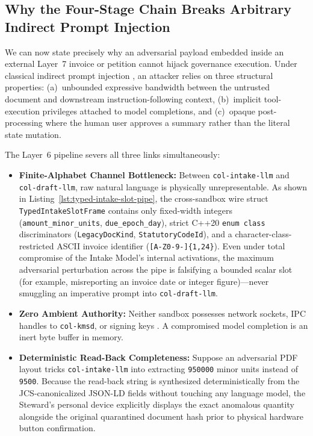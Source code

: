 \subsection{Why the Four-Stage Chain Breaks Arbitrary Indirect Prompt Injection}
\label{subsec:injection-proof}

We can now state precisely why an adversarial payload embedded inside an external Layer~7 invoice or petition cannot hijack governance execution. Under classical indirect prompt injection \parencite{greshake2023injection}, an attacker relies on three structural properties: (a)~unbounded expressive bandwidth between the untrusted document and downstream instruction-following context, (b)~implicit tool-execution privileges attached to model completions, and (c)~opaque post-processing where the human user approves a summary rather than the literal state mutation.

The Layer~6 pipeline severs all three links simultaneously:
\begin{itemize}
  \item \textbf{Finite-Alphabet Channel Bottleneck:} Between \texttt{col-intake-llm} and \texttt{col-draft-llm}, raw natural language is physically unrepresentable. As shown in Listing~\ref{lst:typed-intake-slot-pipe}, the cross-sandbox wire struct \texttt{TypedIntakeSlotFrame} contains only fixed-width integers (\texttt{amount\_minor\_units}, \texttt{due\_epoch\_day}), strict C++20 \texttt{enum class} discriminators (\texttt{LegacyDocKind}, \texttt{StatutoryCodeId}), and a character-class-restricted ASCII invoice identifier (\texttt{[A-Z0-9-]\{1,24\}}). Even under total compromise of the Intake Model's internal activations, the maximum adversarial perturbation across the pipe is falsifying a bounded scalar slot (for example, misreporting an invoice date or integer figure)---never smuggling an imperative prompt into \texttt{col-draft-llm}.
  \item \textbf{Zero Ambient Authority:} Neither sandbox possesses network sockets, IPC handles to \texttt{col-kmsd}, or signing keys \parencite{miller2006robust}. A compromised model completion is an inert byte buffer in memory.
  \item \textbf{Deterministic Read-Back Completeness:} Suppose an adversarial PDF layout tricks \texttt{col-intake-llm} into extracting \texttt{950000} minor units instead of \texttt{9500}. Because the read-back string is synthesized deterministically from the JCS-canonicalized JSON-LD fields without touching any language model, the Steward's personal device explicitly displays the exact anomalous quantity alongside the original quarantined document hash prior to physical hardware button confirmation.
\end{itemize}

